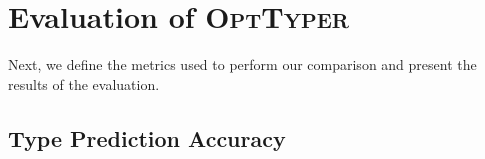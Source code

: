 \documentclass[acmsmall, review, anonymous]{acmart}\settopmatter{printfolios=true,printccs=false,printacmref=false}
\newcommand{\projectname}{\textsc{OptTyper}\xspace}
\begin{document}




\section{Evaluation of \projectname{}}\label{sec:eval}
Next, we define the metrics used to perform our comparison and present the results of the evaluation.



\subsection{Type Prediction Accuracy}\label{sec:acc}
\end{document}
